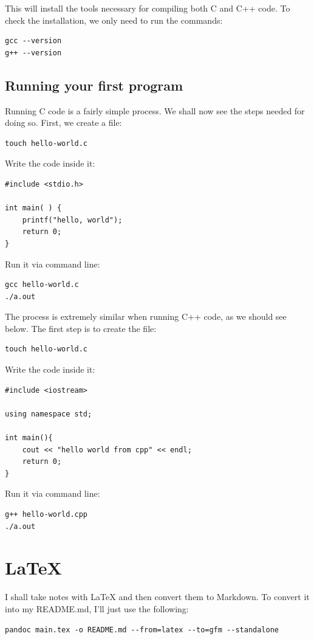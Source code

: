 \documentclass{article}
\begin{document}
This will install the tools necessary for compiling both C and C++ code. To check the installation, we only need to run the commands:

\begin{verbatim}
gcc --version
g++ --version
\end{verbatim}


\subsection{Running your first program}
Running C code is a fairly simple process. We shall now see the steps needed for doing so. First, we create a file:
\begin{verbatim}
touch hello-world.c
\end{verbatim}

Write the code inside it:
\begin{verbatim}
#include <stdio.h>

int main( ) {
    printf("hello, world");
    return 0;
}
\end{verbatim}

Run it via command line:
\begin{verbatim}
gcc hello-world.c 
./a.out 
\end{verbatim}

The process is extremely similar when running C++ code, as we should see below. The first step is to create the file:
\begin{verbatim}
touch hello-world.c
\end{verbatim}

Write the code inside it:
\begin{verbatim}
#include <iostream>

using namespace std;

int main(){
    cout << "hello world from cpp" << endl;
    return 0;
}
\end{verbatim}

Run it via command line:
\begin{verbatim}
g++ hello-world.cpp
./a.out 
\end{verbatim}


\section{\LaTeX}
I shall take notes with \LaTeX{} and then convert them to Markdown. To convert it into my README.md, I'll just use the following:
\begin{verbatim}
pandoc main.tex -o README.md --from=latex --to=gfm --standalone
\end{verbatim}



% 
% 
\end{document}
